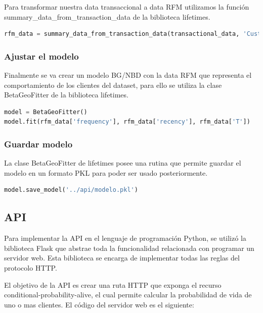Para transformar nuestra data transaccional a data RFM utilizamos la función summary\_data\_from\_transaction\_data de la biblioteca lifetimes.
	
\begin{lstlisting}[language=Python, caption=Formato RFM en modelo.ipynb]
rfm_data = summary_data_from_transaction_data(transactional_data, 'CustomerNo', 'Date', observation_period_end='2019-12-31')
\end{lstlisting}

\subsubsection{Ajustar el modelo}

Finalmente se va crear un modelo BG/NBD con la data RFM que representa el comportamiento de los clientes del dataset, para ello se utiliza la clase BetaGeoFitter de la biblioteca lifetimes.

\begin{lstlisting}[language=Python, caption=Ajustar Modelo en modelo.ipynb]
model = BetaGeoFitter()
model.fit(rfm_data['frequency'], rfm_data['recency'], rfm_data['T'])
\end{lstlisting}

\subsubsection{Guardar modelo}

La clase BetaGeoFitter de lifetimes posee una rutina que permite guardar el modelo en un formato PKL para poder ser usado posteriormente.

\begin{lstlisting}[language=Python, caption=Guardar Modelo en modelo.ipynb]
model.save_model('../api/modelo.pkl')
\end{lstlisting}

\subsection{API}

Para implementar la API en el lenguaje de programación Python, se utilizó la biblioteca Flask que abstrae toda la funcionalidad relacionada con programar un servidor web. Esta biblioteca se encarga de implementar todas las reglas del protocolo HTTP.

	El objetivo de la API es crear una ruta HTTP que exponga el recurso conditional-probability-alive, el cual permite calcular la probabilidad de vida de uno o mas clientes. El código del servidor web es el siguiente:
	
